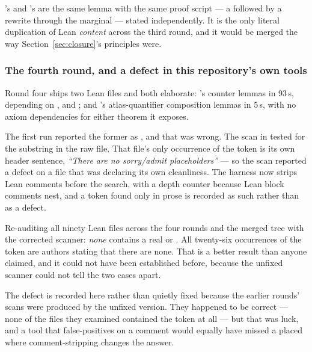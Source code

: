 \begin{remark}
's  and 's
 are the same lemma with the same proof script --- a
 followed by a rewrite through the marginal --- stated
independently. It is the only literal duplication of Lean \emph{content}
across the third round, and it would be merged the way
Section~\ref{sec:closure}'s principles were.
\end{remark}

\subsubsection*{The fourth round, and a defect in this repository's own tools}

Round four ships two Lean files and both elaborate: 's counter lemmas
in 93\,s, depending on ,  and
; and 's atlas-quantifier composition lemmas in
5\,s, with no axiom dependencies for either theorem it exposes.

The first run reported the former as , and that
was wrong. The scan in  tested for the substring
 in the raw file. That file's only occurrence of the token is its
own header sentence, \emph{``There are no sorry/admit placeholders''} --- so
the scan reported a defect on a file that was declaring its own cleanliness.
The harness now strips Lean comments before the search, with a depth counter
because Lean block comments nest, and a token found only in prose is recorded
as such rather than as a defect.

Re-auditing all ninety Lean files across the four rounds and the merged
tree with the corrected scanner: \emph{none} contains a real  or
. All twenty-six occurrences of the token are authors stating
that there are none. That is a better result than anyone claimed, and it could
not have been established before, because the unfixed scanner could not tell
the two cases apart.

The defect is recorded here rather than quietly fixed because the earlier
rounds' scans were produced by the unfixed version. They happened to be correct
--- none of the files they examined contained the token at all --- but that was
luck, and a tool that false-positives on a comment would equally have missed a
 placed where comment-stripping changes the answer.

